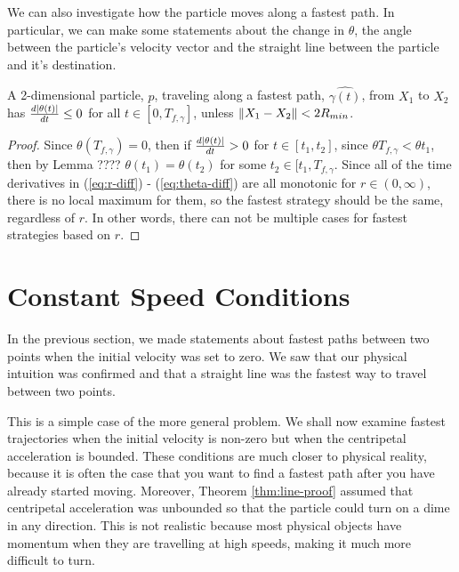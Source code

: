 We can also investigate how the particle moves along a fastest path. In particular, we can make some statements about the change in $\theta$, the angle between the particle's velocity vector and the straight line between the particle and it's destination.

\begin{theorem}
A 2-dimensional particle, $p$, traveling along a fastest path, $\hat{\gamma(t)}$, from $X_1$ to $X_2$ has $\frac{d\abs{\theta(t)}}{dt} \leq 0$ for all $t \in [0, T_{f, \gamma}]$, unless $\norm{X_1 - X_2} < 2 R_{min}$.
\end{theorem}

\begin{proof}
Since $\theta(T_{f,\gamma}) = 0$, then if $\frac{d\abs{\theta(t)}}{dt} > 0$ for $t \in [t_1, t_2]$, since $\theta{T_{f,\gamma}} < \theta{t_1}$, then by Lemma ???? $\theta(t_1) = \theta(t_2)$ for some $t_2 \in [t_1, T_{f, \gamma}$. Since all of the time derivatives in (\ref{eq:r-diff}) - (\ref{eq:theta-diff}) are all monotonic for $r \in (0, \infty)$, there is no local maximum for them, so the fastest strategy should be the same, regardless of $r$. In other words, there can not be multiple cases for fastest strategies based on $r$.
\end{proof}





\section{Constant Speed Conditions}

In the previous section, we made statements about fastest paths between two points when the initial velocity was set to zero. We saw that our physical intuition was confirmed and that a straight line was the fastest way to travel between two points.

This is a simple case of the more general problem. We shall now examine fastest trajectories when the initial velocity is non-zero but when the centripetal acceleration is bounded. These conditions are much closer to physical reality, because it is often the case that you want to find a fastest path after you have already started moving. Moreover, Theorem \ref{thm:line-proof} assumed that centripetal acceleration was unbounded so that the particle could turn on a dime in any direction. This is not realistic because most physical objects have momentum when they are travelling at high speeds, making it much more difficult to turn.

